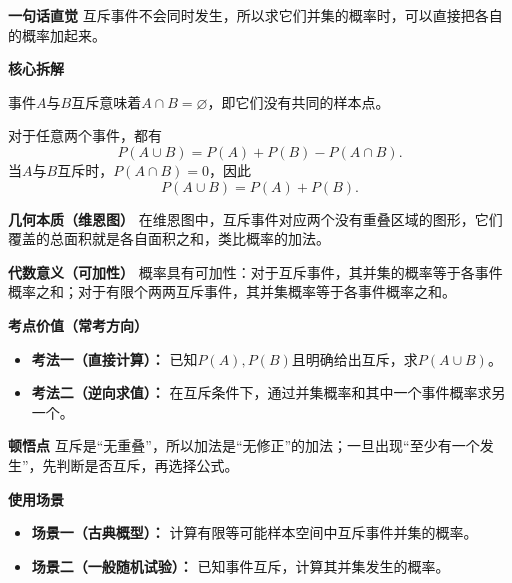 \begin{explanationbox}
\textbf{\textcolor{CExplanation}{一句话直觉}}
互斥事件不会同时发生，所以求它们并集的概率时，可以直接把各自的概率加起来。

\medskip
\textbf{\textcolor{CExplanation}{核心拆解}}
\begin{description}[style=nextline, leftmargin=2.8em, labelsep=0.5em, itemsep=0.45em]
    \item[\textbf{要点一（互斥定义）：}]
    事件$A$与$B$互斥意味着$A\cap B=\varnothing$，即它们没有共同的样本点。

    \item[\textbf{要点二（概率加性）：}]
    对于任意两个事件，都有
    \[
        P(A\cup B)=P(A)+P(B)-P(A\cap B).
    \]
    当$A$与$B$互斥时，$P(A\cap B)=0$，因此
    \[
        P(A\cup B)=P(A)+P(B).
    \]
\end{description}

\medskip
\textbf{\textcolor{CExplanation}{几何本质（维恩图）}}
在维恩图中，互斥事件对应两个没有重叠区域的图形，它们覆盖的总面积就是各自面积之和，类比概率的加法。

\medskip
\textbf{\textcolor{CExplanation}{代数意义（可加性）}}
概率具有可加性：对于互斥事件，其并集的概率等于各事件概率之和；对于有限个两两互斥事件，其并集概率等于各事件概率之和。

\medskip
\textbf{\textcolor{CExplanation}{考点价值（常考方向）}}
\begin{itemize}[leftmargin=*, itemsep=0.5em, topsep=0.4em]
    \item \textbf{考法一（直接计算）：}
    已知$P(A),P(B)$且明确给出互斥，求$P(A\cup B)$。

    \item \textbf{考法二（逆向求值）：}
    在互斥条件下，通过并集概率和其中一个事件概率求另一个。
\end{itemize}

\medskip
\textbf{\textcolor{CExplanation}{顿悟点}}
互斥是“无重叠”，所以加法是“无修正”的加法；一旦出现“至少有一个发生”，先判断是否互斥，再选择公式。

\medskip
\textbf{\textcolor{CExplanation}{使用场景}}
\begin{itemize}[leftmargin=*, itemsep=0.5em, topsep=0.4em]
    \item \textbf{场景一（古典概型）：}
    计算有限等可能样本空间中互斥事件并集的概率。

    \item \textbf{场景二（一般随机试验）：}
    已知事件互斥，计算其并集发生的概率。
\end{itemize}
\end{explanationbox}